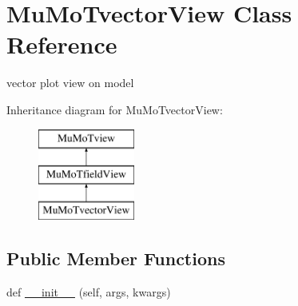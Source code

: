 \hypertarget{class_mu_mo_t_1_1_mu_mo_t_1_1_mu_mo_tvector_view}{}\section{Mu\+Mo\+Tvector\+View Class Reference}
\label{class_mu_mo_t_1_1_mu_mo_t_1_1_mu_mo_tvector_view}


vector plot view on model  


Inheritance diagram for Mu\+Mo\+Tvector\+View\+:\begin{figure}[H]
\begin{center}
\leavevmode
\includegraphics[height=3.000000cm]{class_mu_mo_t_1_1_mu_mo_t_1_1_mu_mo_tvector_view}
\end{center}
\end{figure}
\subsection*{Public Member Functions}
\begin{DoxyCompactItemize}
\item 
def \hyperlink{class_mu_mo_t_1_1_mu_mo_t_1_1_mu_mo_tvector_view_a302afe6819b093163cc8ea6f029c75da}{\+\_\+\+\_\+init\+\_\+\+\_\+} (self, args, kwargs)
\end{DoxyCompactItemize}
